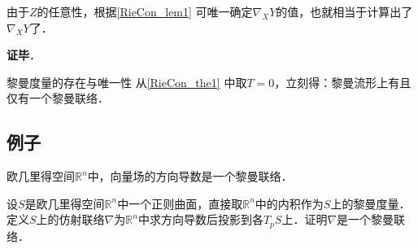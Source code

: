 由于$Z$的任意性，根据\autoref{RieCon_lem1} 可唯一确定$\nabla_XY$的值，也就相当于计算出了$\nabla_XY$了．

\textbf{证毕}．

\begin{corollary}{黎曼度量的存在与唯一性}
从\autoref{RieCon_the1} 中取$T=0$，立刻得：黎曼流形上有且仅有一个黎曼联络．
\end{corollary}

\subsection{例子}

\begin{example}{}
欧几里得空间$\mathbb{R}^n$中，向量场的方向导数是一个黎曼联络．
\end{example}


\begin{exercise}{}
设$S$是欧几里得空间$\mathbb{R}^n$中一个正则曲面，直接取$\mathbb{R}^n$中的内积作为$S$上的黎曼度量．定义$S$上的仿射联络$\nabla$为$\mathbb{R}^n$中求方向导数后投影到各$T_pS$上．证明$\nabla$是一个黎曼联络．
\end{exercise}






